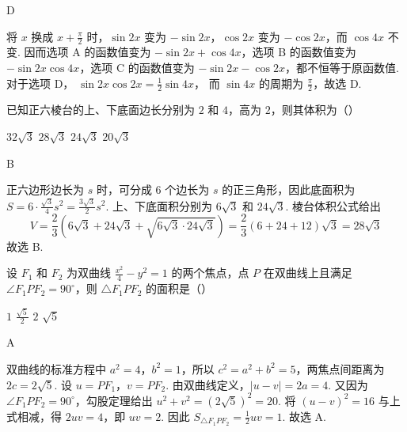 \begin{answer}
D
\end{answer}

\begin{solution}
将 \(x\) 换成 \(x+\frac{\pi}{2}\) 时，\(\sin 2x\) 变为 \(-\sin 2x\)，\(\cos 2x\) 变为 \(-\cos 2x\)，而 \(\cos 4x\) 不变. 因而选项 A 的函数值变为 \(-\sin 2x+\cos 4x\)，选项 B 的函数值变为 \(-\sin 2x\cos 4x\)，选项 C 的函数值变为 \(-\sin 2x-\cos 2x\)，都不恒等于原函数值. 对于选项 D，
\(\sin 2x\cos 2x=\frac12\sin 4x\)，
而 \(\sin 4x\) 的周期为 \(\frac{\pi}{2}\)，故选 D.
\end{solution}

\begin{problem}
已知正六棱台的上、下底面边长分别为 \(2\) 和 \(4\)，高为 \(2\)，则其体积为（\quad）

\choices
    {\(32\sqrt{3}\)}
    {\(28\sqrt{3}\)}
    {\(24\sqrt{3}\)}
    {\(20\sqrt{3}\)}
\end{problem}

\begin{answer}
B
\end{answer}

\begin{solution}
正六边形边长为 \(s\) 时，可分成 6 个边长为 \(s\) 的正三角形，因此底面积为 \(S=6\cdot\frac{\sqrt{3}}{4}s^2=\frac{3\sqrt{3}}{2}s^2\).
上、下底面积分别为 \(6\sqrt{3}\) 和 \(24\sqrt{3}\). 棱台体积公式给出
\[
V=\frac{2}{3}\left(6\sqrt{3}+24\sqrt{3}+\sqrt{6\sqrt{3}\cdot24\sqrt{3}}\right)
=\frac{2}{3}\left(6+24+12\right)\sqrt{3}=28\sqrt{3}
\]
故选 B.
\end{solution}

\begin{problem}
设 \(F_{1}\) 和 \(F_{2}\) 为双曲线 \(\frac{x^2}{4} - y^2 = 1\) 的两个焦点，点 \(P\) 在双曲线上且满足 \(\angle F_1PF_2 = 90^\circ\)，则 \(\triangle F_1PF_2\) 的面积是（\quad）

\choices
    {\(1\)}
    {\(\frac{\sqrt{5}}{2}\)}
    {\(2\)}
    {\(\sqrt{5}\)}
\end{problem}

\begin{answer}
A
\end{answer}

\begin{solution}
双曲线的标准方程中 \(a^2=4\)，\(b^2=1\)，所以 \(c^2=a^2+b^2=5\)，两焦点间距离为 \(2c=2\sqrt{5}\). 设
\(u=PF_1\)，\(v=PF_2\).
由双曲线定义，\(\lvert u-v\rvert=2a=4\). 又因为 \(\angle F_1PF_2=90^\circ\)，勾股定理给出 \(u^2+v^2=(2\sqrt{5})^2=20\). 将 \((u-v)^2=16\) 与上式相减，得 \(2uv=4\)，即 \(uv=2\). 因此 \(S_{\triangle F_1PF_2}=\frac12uv=1\).
故选 A.
\end{solution}

